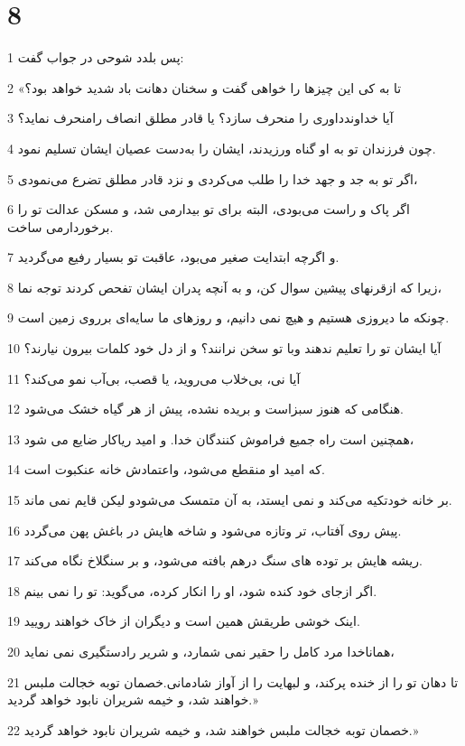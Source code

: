 \chapter{8}

\par 1 پس بلدد شوحی در جواب گفت:
\par 2 «تا به کی این چیزها را خواهی گفت و سخنان دهانت باد شدید خواهد بود؟
\par 3 آیا خداوندداوری را منحرف سازد؟ یا قادر مطلق انصاف رامنحرف نماید؟
\par 4 چون فرزندان تو به او گناه ورزیدند، ایشان را به‌دست عصیان ایشان تسلیم نمود.
\par 5 اگر تو به جد و جهد خدا را طلب می‌کردی و نزد قادر مطلق تضرع می‌نمودی،
\par 6 اگر پاک و راست می‌بودی، البته برای تو بیدارمی شد، و مسکن عدالت تو را برخوردارمی ساخت.
\par 7 و اگر‌چه ابتدایت صغیر می‌بود، عاقبت تو بسیار رفیع می‌گردید.
\par 8 زیرا که ازقرنهای پیشین سوال کن، و به آنچه پدران ایشان تفحص کردند توجه نما،
\par 9 چونکه ما دیروزی هستیم و هیچ نمی دانیم، و روزهای ما سایه‌ای برروی زمین است.
\par 10 آیا ایشان تو را تعلیم ندهند وبا تو سخن نرانند؟ و از دل خود کلمات بیرون نیارند؟
\par 11 آیا نی، بی‌خلاب می‌روید، یا قصب، بی‌آب نمو می‌کند؟
\par 12 هنگامی که هنوز سبزاست و بریده نشده، پیش از هر گیاه خشک می‌شود.
\par 13 همچنین است راه جمیع فراموش کنندگان خدا. و امید ریاکار ضایع می شود،
\par 14 که امید او منقطع می‌شود، واعتمادش خانه عنکبوت است.
\par 15 بر خانه خودتکیه می‌کند و نمی ایستد، به آن متمسک می‌شودو لیکن قایم نمی ماند.
\par 16 پیش روی آفتاب، تر وتازه می‌شود و شاخه هایش در باغش پهن می‌گردد.
\par 17 ریشه هایش بر توده های سنگ درهم بافته می‌شود، و بر سنگلاخ نگاه می‌کند.
\par 18 اگر ازجای خود کنده شود، او را انکار کرده، می‌گوید: تو را نمی بینم.
\par 19 اینک خوشی طریقش همین است و دیگران از خاک خواهند رویید.
\par 20 هماناخدا مرد کامل را حقیر نمی شمارد، و شریر رادستگیری نمی نماید،
\par 21 تا دهان تو را از خنده پرکند، و لبهایت را از آواز شادمانی.خصمان توبه خجالت ملبس خواهند شد، و خیمه شریران نابود خواهد گردید.»
\par 22 خصمان توبه خجالت ملبس خواهند شد، و خیمه شریران نابود خواهد گردید.»
 
